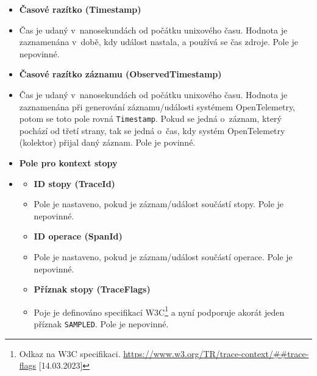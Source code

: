 \begin{itemize}
        \item{\textbf{Časové razítko (Timestamp)}}
        \item[] 
            Čas je udaný v~nanosekundách od počátku unixového času. Hodnota je zaznamenána v~době, kdy událost nastala, a používá se čas zdroje. Pole je nepovinné.
        \item{\textbf{Časové razítko záznamu (ObservedTimestamp)}}
        \item[]
            Čas je udaný v~nanosekundách od počátku unixového času. Hodnota je zaznamenána při generování záznamu/události systémem OpenTelemetry, potom se toto pole rovná \texttt{Timestamp}. Pokud se jedná o~záznam, který pochází od třetí strany, tak se jedná o~čas, kdy systém OpenTelemetry (kolektor) přijal daný záznam. Pole je povinné.
        \item{\textbf{Pole pro kontext stopy}}
        \item[]
        \begin{itemize}
            \item{\textbf{ID stopy (TraceId)}}
            \item[]
                Pole je nastaveno, pokud je záznam/událost součástí stopy. Pole je nepovinné.
            \item{\textbf{ID operace (SpanId)}}
            \item[]
                Pole je nastaveno, pokud je záznam/událost součástí operace. Pole je nepovinné.
            \item{\textbf{Příznak stopy (TraceFlags)}}
            \item[]
                Poje je definováno specifikací W3C\footnote{Odkaz na W3C specifikaci. \url{https://www.w3.org/TR/trace-context/##trace-flags} [14.03.2023]} a nyní podporuje akorát jeden příznak \texttt{SAMPLED}. Pole je nepovinné.
            

\end{itemize}
\end{itemize}
